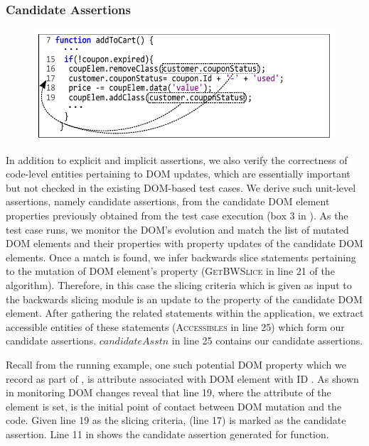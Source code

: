 \subsubsection{Candidate Assertions} \label{Sec:candidateAssertions}
\begin{figure}[!t]
  \centering
  \includegraphics[width=1\hsize]{fig/candidateDOMToCode}
  \vspace{-0.3in} 
  \label{Fig:candidateDOMToCode}
  \vspace{-0.2in} 
\end{figure}
In addition to explicit and implicit assertions, we also verify the correctness of code-level entities pertaining to DOM updates, which are essentially important but not checked in the existing DOM-based test cases. We derive such unit-level assertions, namely candidate assertions, from the candidate DOM element properties previously obtained from the test case execution (box 3 in ). As the test case runs, we monitor the DOM's evolution and match the list of mutated DOM elements and their properties with property updates of the candidate DOM elements. Once a match is found, we infer backwards slice statements pertaining to the mutation of DOM element's property (\textsc{GetBWSlice} in line 21 of the algorithm). Therefore, in this case the slicing criteria which is given as input to the backwards slicing module is an update to the property of the candidate DOM element.
After gathering the related \javascript statements within the application, we extract accessible entities of these statements (\textsc{Accessibles} in line 25) which form our candidate assertions. $candidateAsstn$ in line 25 contains our candidate assertions. 

Recall from the running example, one such potential DOM property which we record as part of , is  attribute associated with DOM element with ID . As shown in  monitoring DOM changes reveal that line 19, where the  attribute of the element is set, is the initial point of contact between DOM mutation and the \javascript code. Given line 19 as the slicing criteria,  (line 17) is marked as the candidate assertion.
Line 11 in  shows the candidate assertion generated for  function. 